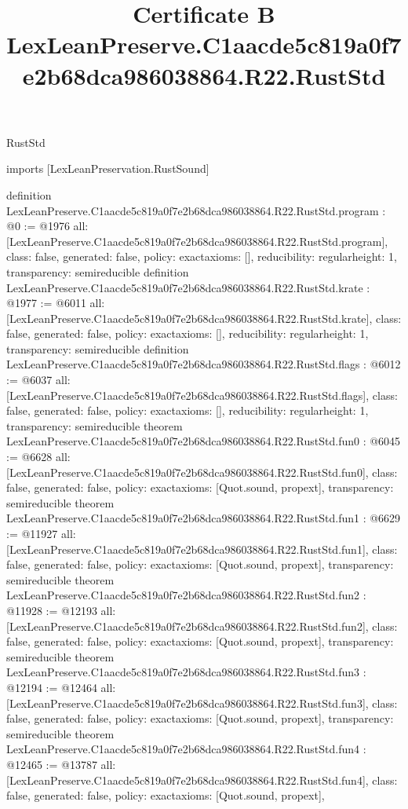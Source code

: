 \begin{lexlean}{RustStd}
\title{Certificate B LexLeanPreserve.C1aacde5c819a0f7e2b68dca986038864.R22.RustStd}
\begin{coremodule}
imports [LexLeanPreservation.RustSound]

definition LexLeanPreserve.C1aacde5c819a0f7e2b68dca986038864.R22.RustStd.program : @0 := @1976 {
  all: [LexLeanPreserve.C1aacde5c819a0f7e2b68dca986038864.R22.RustStd.program],
  class: false,
  generated: false,
  policy: exact{axioms: []},
  reducibility: regular{height: 1},
  transparency: semireducible
}
definition LexLeanPreserve.C1aacde5c819a0f7e2b68dca986038864.R22.RustStd.krate : @1977 := @6011 {
  all: [LexLeanPreserve.C1aacde5c819a0f7e2b68dca986038864.R22.RustStd.krate],
  class: false,
  generated: false,
  policy: exact{axioms: []},
  reducibility: regular{height: 1},
  transparency: semireducible
}
definition LexLeanPreserve.C1aacde5c819a0f7e2b68dca986038864.R22.RustStd.flags : @6012 := @6037 {
  all: [LexLeanPreserve.C1aacde5c819a0f7e2b68dca986038864.R22.RustStd.flags],
  class: false,
  generated: false,
  policy: exact{axioms: []},
  reducibility: regular{height: 1},
  transparency: semireducible
}
theorem LexLeanPreserve.C1aacde5c819a0f7e2b68dca986038864.R22.RustStd.fun0 : @6045 := @6628 {
  all: [LexLeanPreserve.C1aacde5c819a0f7e2b68dca986038864.R22.RustStd.fun0],
  class: false,
  generated: false,
  policy: exact{axioms: [Quot.sound, propext]},
  transparency: semireducible
}
theorem LexLeanPreserve.C1aacde5c819a0f7e2b68dca986038864.R22.RustStd.fun1 : @6629 := @11927 {
  all: [LexLeanPreserve.C1aacde5c819a0f7e2b68dca986038864.R22.RustStd.fun1],
  class: false,
  generated: false,
  policy: exact{axioms: [Quot.sound, propext]},
  transparency: semireducible
}
theorem LexLeanPreserve.C1aacde5c819a0f7e2b68dca986038864.R22.RustStd.fun2 : @11928 := @12193 {
  all: [LexLeanPreserve.C1aacde5c819a0f7e2b68dca986038864.R22.RustStd.fun2],
  class: false,
  generated: false,
  policy: exact{axioms: [Quot.sound, propext]},
  transparency: semireducible
}
theorem LexLeanPreserve.C1aacde5c819a0f7e2b68dca986038864.R22.RustStd.fun3 : @12194 := @12464 {
  all: [LexLeanPreserve.C1aacde5c819a0f7e2b68dca986038864.R22.RustStd.fun3],
  class: false,
  generated: false,
  policy: exact{axioms: [Quot.sound, propext]},
  transparency: semireducible
}
theorem LexLeanPreserve.C1aacde5c819a0f7e2b68dca986038864.R22.RustStd.fun4 : @12465 := @13787 {
  all: [LexLeanPreserve.C1aacde5c819a0f7e2b68dca986038864.R22.RustStd.fun4],
  class: false,
  generated: false,
  policy: exact{axioms: [Quot.sound, propext]},
}
\end{coremodule}
\end{lexlean}
